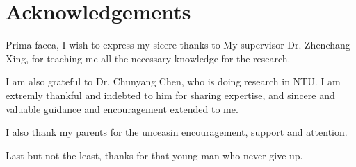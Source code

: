 
\chapter*{Acknowledgements}
\label{cha:ack}

Prima facea, I wish to express my sicere thanks to My supervisor Dr. Zhenchang Xing, for teaching me all the necessary knowledge for the research.

I am also grateful to Dr. Chunyang Chen, who is doing research in NTU. I am extremly thankful and indebted to him for sharing expertise, and sincere and valuable guidance and encouragement extended to me.

I also thank my parents for the unceasin encouragement, support and attention. 

Last but not the least, thanks for that young man who never give up.



